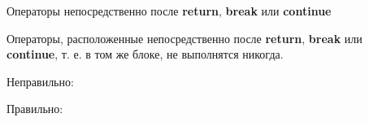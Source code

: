 \begin{typerror}
	\label{TE_operators-after-delete-break-continue}
	Операторы непосредственно после \textbf{return}, \textbf{break} или \textbf{continue}

	Операторы, расположенные непосредственно после \textbf{return}, \textbf{break} или \textbf{continue}, т. е. в том же блоке, не выполнятся никогда.

	Неправильно:

	Правильно:

\end  {typerror}
